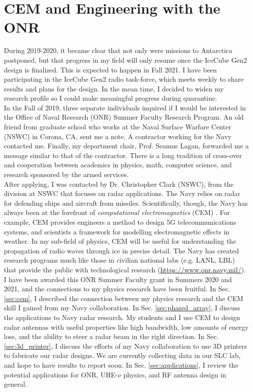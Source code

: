 \documentclass[../../../main.tex]{subfiles}
\begin{document}
\section{CEM and Engineering with the ONR}
\label{sec:naval_research}

During 2019-2020, it became clear that not only were missions to Antarctica postponed, but that progress in my field will only resume once the IceCube Gen2 design is finalized.  This is expected to happen in Fall 2021.  I have been participating in the IceCube Gen2 radio task-force, which meets weekly to share results and plans for the design.  In the mean time, I decided to widen my research profile so I could make meaningful progress during quarantine.
\\
\vspace{0.25cm}
In the Fall of 2019, three separate individuals inquired if I would be interested in the Office of Naval Research (ONR) Summer Faculty Research Program.  An old friend from graduate school who works at the Naval Surface Warfare Center (NSWC) in Corona, CA, sent me a note.  A contractor working for the Navy contacted me.  Finally, my department chair, Prof. Seamus Lagan, forwarded me a message similar to that of the contractor.  There is a long tradition of cross-over and cooperation between academics in physics, math, computer science, and research sponsored by the armed services.
\\
\vspace{0.25cm}
After applying, I was contacted by Dr. Christopher Clark (NSWC), from the division at NSWC that focuses on radar applications.  The Navy relies on radar for defending ships and aircraft from missiles.  Scientifically, though, the Navy has always been at the forefront of \textit{computational electromagnetics} (CEM) \cite{cem}.  For example, CEM provides engineers a method to design 5G telecommunications systems, and scientists a framework for modelling electromagnetic effects in weather.  In my sub-field of physics, CEM will be useful for understanding the propagation of radio waves through ice in precise detail.  The Navy has created research programs much like those in civilian national labs (e.g. LANL, LBL) that provide the public with technological research (\url{https://www.onr.navy.mil/}).
\\
\vspace{0.25cm}
I have been awarded this ONR Summer Faculty grant in Summers 2020 and 2021, and the connections to my physics research have been fruitful.  In Sec. \ref{sec:cem}, I described the connection between my physics research and the CEM skill I gained from my Navy collaboration.  In Sec. \ref{sec:phased_array}, I discuss the applications to Navy radar research.  My students and I use CEM to design radar antennas with useful properties like high bandwidth, low amounts of energy loss, and the ability to steer a radar beam in the right direction.  In Sec. \ref{sec:3d_printer}, I discuss the efforts of my Navy collaboration to use 3D printers to fabricate our radar designs.  We are currently collecting data in our SLC lab, and hope to have results to report soon.  In Sec. \ref{sec:applications}, I review the potential applications for ONR, UHE-$\nu$ physics, and RF antenna design in general.
\end{document}
